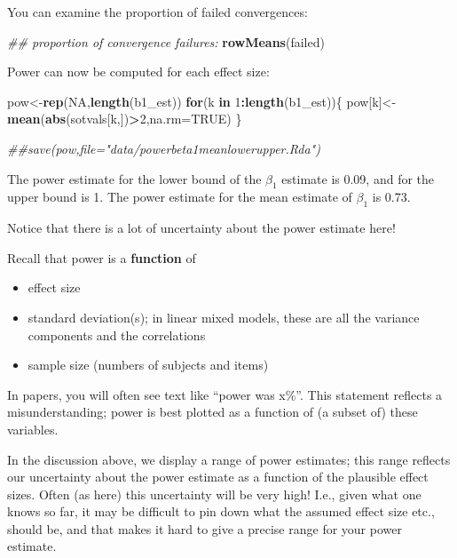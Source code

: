 \documentclass[12pt,]{krantz}
\newenvironment{Shaded}{\begin{snugshade}}{\end{snugshade}}
\newcommand{\CommentTok}[1]{\textcolor[rgb]{0.56,0.35,0.01}{\textit{#1}}}
\newcommand{\ControlFlowTok}[1]{\textcolor[rgb]{0.13,0.29,0.53}{\textbf{#1}}}
\newcommand{\DataTypeTok}[1]{\textcolor[rgb]{0.13,0.29,0.53}{#1}}
\newcommand{\DecValTok}[1]{\textcolor[rgb]{0.00,0.00,0.81}{#1}}
\newcommand{\KeywordTok}[1]{\textcolor[rgb]{0.13,0.29,0.53}{\textbf{#1}}}
\newcommand{\NormalTok}[1]{#1}
\newcommand{\OperatorTok}[1]{\textcolor[rgb]{0.81,0.36,0.00}{\textbf{#1}}}
\newcommand{\OtherTok}[1]{\textcolor[rgb]{0.56,0.35,0.01}{#1}}
\providecommand{\tightlist}{%
  \setlength{\itemsep}{0pt}\setlength{\parskip}{0pt}}
\begin{document}
You can examine the proportion of failed convergences:

\begin{Shaded}
\begin{Highlighting}[]
\CommentTok{## proportion of convergence failures:}
\KeywordTok{rowMeans}\NormalTok{(failed)}
\end{Highlighting}
\end{Shaded}

Power can now be computed for each effect size:

\begin{Shaded}
\begin{Highlighting}[]
\NormalTok{pow<-}\KeywordTok{rep}\NormalTok{(}\OtherTok{NA}\NormalTok{,}\KeywordTok{length}\NormalTok{(b1_est))}
\ControlFlowTok{for}\NormalTok{(k }\ControlFlowTok{in} \DecValTok{1}\OperatorTok{:}\KeywordTok{length}\NormalTok{(b1_est))\{}
\NormalTok{  pow[k]<-}\KeywordTok{mean}\NormalTok{(}\KeywordTok{abs}\NormalTok{(sotvals[k,])}\OperatorTok{>}\DecValTok{2}\NormalTok{,}\DataTypeTok{na.rm=}\OtherTok{TRUE}\NormalTok{)}
\NormalTok{\}}

\CommentTok{##save(pow,file="data/powerbeta1meanlowerupper.Rda")}
\end{Highlighting}
\end{Shaded}

The power estimate for the lower bound of the \(\beta_1\) estimate is 0.09, and for the upper bound is 1. The power estimate for the mean estimate of \(\beta_1\) is 0.73.

Notice that there is a lot of uncertainty about the power estimate here!

Recall that power is a \textbf{function} of

\begin{itemize}
\tightlist
\item
  effect size
\item
  standard deviation(s); in linear mixed models, these are all the variance components and the correlations
\item
  sample size (numbers of subjects and items)
\end{itemize}

In papers, you will often see text like ``power was x\%''. This statement reflects a misunderstanding; power is best plotted as a function of (a subset of) these variables.

In the discussion above, we display a range of power estimates; this range reflects our uncertainty about the power estimate as a function of the plausible effect sizes. Often (as here) this uncertainty will be very high! I.e., given what one knows so far, it may be difficult to pin down what the assumed effect size etc., should be, and that makes it hard to give a precise range for your power estimate.
\end{document}

